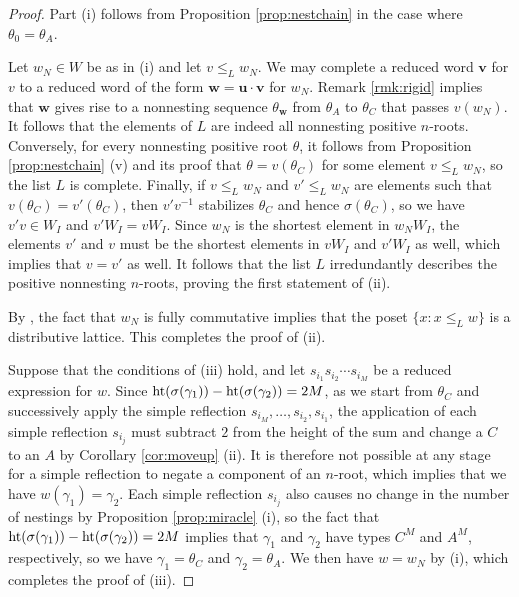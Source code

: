 \documentclass[11pt]{amsart}
\theoremstyle{plain}
\theoremstyle{definition}
\theoremstyle{remark}
\numberwithin{equation}{subsection}
\newcommand{\bfw}{\mathbf{w}}
\newcommand{\rootht}{\text{\rm ht}}
\newcommand{\inverse}{^{-1}}
\begin{document}
\begin{proof}
Part (i) follows from Proposition \ref{prop:nestchain} in the case where
$\theta_0 = \theta_A$.

Let $w_N \in W$ be as in (i) and let $v\le_L w_N$. We may complete a reduced
word $\mathbf{v}$ for $v$ to a reduced word of the form $\bfw=\mathbf{u}\cdot
\mathbf{v}$ for $w_N$. Remark \ref{rmk:rigid} implies that $\bfw$ gives rise to
a nonnesting sequence $\theta_\bfw$ from $\theta_A$ to $\theta_C$ that passes
$v(w_N)$. It follows that the elements of $L$ are indeed all nonnesting positive
$n$-roots.  Conversely, for every nonnesting positive root $\theta$, it follows
from Proposition \ref{prop:nestchain} (v) and its proof that
$\theta=v(\theta_C)$ for some element $v\le_L w_N$, so the list $L$ is complete.
Finally, if $v\le_L w_N$ and $v'\le_L w_N$ are elements such that
$v(\theta_C)=v'(\theta_C)$, then $v'v\inverse$ stabilizes $\theta_C$ and hence
$\sigma(\theta_C)$, so we have $v'v\in W_I$ and $v'W_I=vW_I$. Since $w_N$ is the
shortest element in $w_NW_I$, the elements $v'$ and $v$ must be the shortest
elements in $vW_I$ and $v'W_I$ as well, which implies that $v=v'$ as well. It
follows that the list $L$ irredundantly describes the positive nonnesting
$n$-roots, proving the first statement of (ii).

By \cite[Theorem 3.2]{FC}, the fact that $w_N$ is fully commutative implies that
the poset $\{x : x \leq_L w\}$ is a distributive lattice. This completes the
proof of (ii).

Suppose that the conditions of (iii) hold, and let $s_{i_1} s_{i_2} \cdots
s_{i_M}$ be a reduced expression for $w$. Since
$\rootht(\sigma(\gamma_1))-\rootht(\sigma(\gamma_2))=2M$, as we start from
$\theta_C$ and successively apply the simple reflection $s_{i_M}, \dots,
s_{i_2}, s_{i_1}$, the application of each simple reflection $s_{i_j}$ must
subtract $2$ from the height of the sum and change a $C$ to an $A$ by Corollary
\ref{cor:moveup} (ii). It is therefore not possible at any stage for a simple
reflection to negate a component of an $n$-root, which implies that we have
$w(\gamma_1)=\gamma_2$. Each simple reflection $s_{i_j}$ also causes no change
in the number of nestings by Proposition \ref{prop:miracle} (i), so the fact
that $\rootht(\sigma(\gamma_1))-\rootht(\sigma(\gamma_2))=2M$ implies that
$\gamma_1$ and $\gamma_2$ have types $C^M$ and $A^M$, respectively, so we have
$\gamma_1 = \theta_C$ and $\gamma_2 = \theta_A$. We then have $w = w_N$ by (i),
which completes the proof of (iii).
\end{proof}
\end{document}
